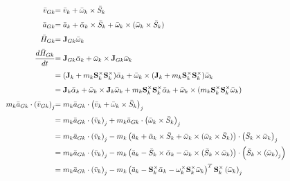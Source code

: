 \documentclass[a4paper,10pt]{article}
\newcommand\scalemath[2]{\scalebox{#1}{\mbox{\ensuremath{\displaystyle #2}}}}
\begin{document}
\begin{align}
 \scalemath{0.775}{\bar{v}_{Gk}}&\scalemath{0.775}{=\bar{v}_k+\bar{\omega}_k \times \bar{S}_k} \\
 \scalemath{0.775}{\bar{a}_{Gk}}&\scalemath{0.775}{=\bar{a}_k+\bar{\alpha}_k \times \bar{S}_k + \bar{\omega}_k \times (\bar{\omega}_k \times \bar{S}_k)} \label{aGk} \\
 \scalemath{0.775}{\bar{H}_{Gk}}&\scalemath{0.775}{=\mathbf{J}_{Gk} \bar{\omega}_k} \\ 
 \scalemath{0.775}{\frac{d\bar{H}_{Gk}}{dt}}&\scalemath{0.775}{=\mathbf{J}_{Gk} \bar{\alpha}_k + \bar{\omega}_k \times \mathbf{J}_{Gk} \bar{\omega}_k} \nonumber \\
 &\scalemath{0.775}{=(\mathbf{J}_{k}+m_k\mathbf{S}^{\times}_k\mathbf{S}^{\times}_k) \bar{\alpha}_k + \bar{\omega}_k \times (\mathbf{J}_{k}+m_k\mathbf{S}^{\times}_k\mathbf{S}^{\times}_k) \bar{\omega}_k} \nonumber \\
 &\scalemath{0.775}{=\mathbf{J}_{k} \bar{\alpha}_k + \bar{\omega}_k \times \mathbf{J}_{k} \bar{\omega}_k + m_k\mathbf{S}^{\times}_k\mathbf{S}^{\times}_k\bar{\alpha}_k + \bar{\omega}_k \times (m_k\mathbf{S}^{\times}_k\mathbf{S}^{\times}_k \bar{\omega}_k)} \\
 \scalemath{0.775}{m_k \bar{a}_{Gk} \cdot \left(\bar{v}_{Gk}\right)_j} &\scalemath{0.775}{=  m_k \bar{a}_{Gk} \cdot \left(\bar{v}_k+\bar{\omega}_k \times \bar{S}_k\right)_j} \nonumber \\
 &\scalemath{0.775}{=  m_k \bar{a}_{Gk} \cdot \left(\bar{v}_k\right)_j + m_k \bar{a}_{Gk} \cdot \left(\bar{\omega}_k \times \bar{S}_k\right)_j} \nonumber \\
 &\scalemath{0.775}{=  m_k \bar{a}_{Gk} \cdot \left(\bar{v}_k\right)_j - m_k \left( \bar{a}_k+\bar{\alpha}_k \times \bar{S}_k + \bar{\omega}_k \times (\bar{\omega}_k \times \bar{S}_k) \right) \cdot \left(\bar{S}_k \times \bar{\omega}_k\right)_j} \nonumber \\
 &\scalemath{0.775}{=  m_k \bar{a}_{Gk} \cdot \left(\bar{v}_k\right)_j - m_k \left( \bar{a}_k-\bar{S}_k \times \bar{\alpha}_k - \bar{\omega}_k \times (\bar{S}_k \times \bar{\omega}_k) \right) \cdot \left(\bar{S}_k \times \left(\bar{\omega}_k\right)_j\right)} \nonumber \\
 &\scalemath{0.775}{=  m_k \bar{a}_{Gk} \cdot \left(\bar{v}_k\right)_j - m_k \left( \bar{a}_k-\mathbf{S}^{\times}_k \bar{\alpha}_k - \mathbf{\omega}^{\times}_k \mathbf{S}^{\times}_k \bar{\omega}_k \right)^T  \mathbf{S}^{\times}_k \left(\bar{\omega}_k\right)_j} \nonumber \\

\end{align}
\end{document}
